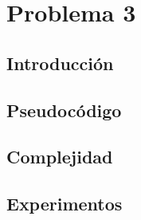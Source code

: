 \section{Problema 3}

\subsection{Introducción}
\subsection{Pseudocódigo}
\subsection{Complejidad}
\subsection{Experimentos}